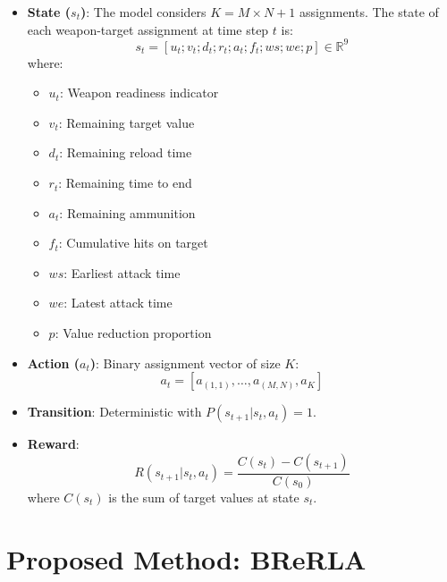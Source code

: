 \documentclass{ieeeaccess}
\begin{document}
\begin{itemize}
\item \textbf{State ($s_t$)}: The model considers $K = M \times N + 1$ assignments. The state of each weapon-target assignment at time step $t$ is:
\begin{equation}
\label{eq:state}
s_t = [u_t; v_t; d_t; r_t; a_t; f_t; ws; we; p] \in \mathbb{R}^9
\end{equation}
where:
\begin{itemize}
    \item $u_t$: Weapon readiness indicator
    \item $v_t$: Remaining target value
    \item $d_t$: Remaining reload time
    \item $r_t$: Remaining time to end
    \item $a_t$: Remaining ammunition
    \item $f_t$: Cumulative hits on target
    \item $ws$: Earliest attack time
    \item $we$: Latest attack time
    \item $p$: Value reduction proportion
\end{itemize}

\item \textbf{Action ($a_t$)}: Binary assignment vector of size $K$:
\begin{equation}
    a_t = [a_{(1,1)}, \ldots, a_{(M,N)}, a_{K}]
\end{equation}

\item \textbf{Transition}: Deterministic with $P(s_{t+1} | s_t, a_t) = 1$.

\item \textbf{Reward}:
\begin{equation}
\label{eq:reward}
    R(s_{t+1} | s_t, a_t) = \frac{C(s_t) - C(s_{t+1})}{C(s_{0})}
\end{equation}
where $C(s_t)$ is the sum of target values at state $s_t$.
\end{itemize}

\section{Proposed Method: BReRLA}
\label{sec:method}
\end{document}
